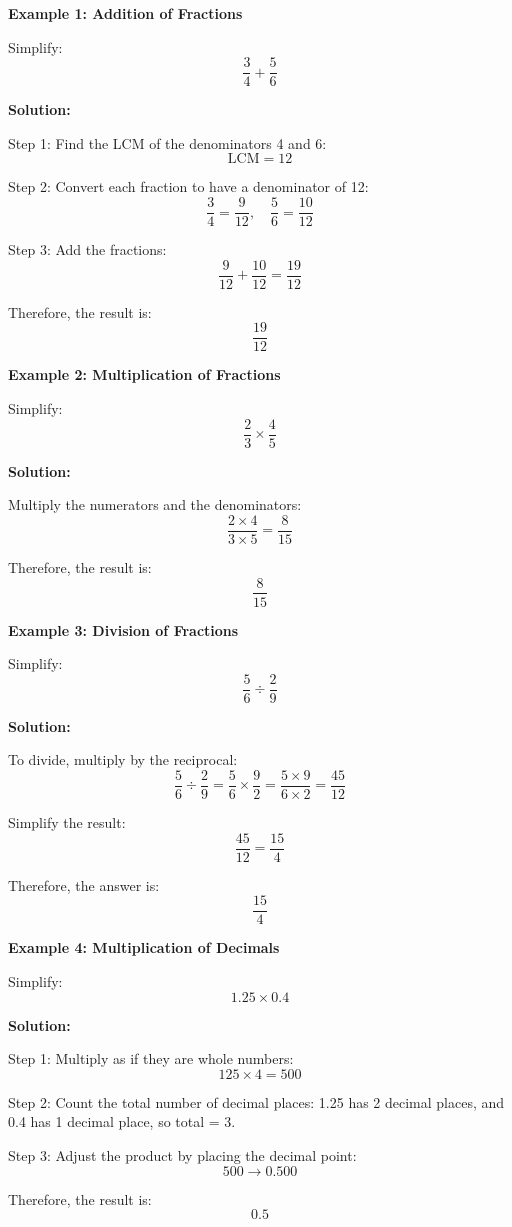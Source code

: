 \begin{flushleft}
\textbf{Example 1: Addition of Fractions}

Simplify:  
\[
\frac{3}{4} + \frac{5}{6}
\]

\textbf{Solution:} \vspace{0.2cm}

Step 1: Find the LCM of the denominators 4 and 6:  
\[
\text{LCM} = 12
\]

Step 2: Convert each fraction to have a denominator of 12:  
\[
\frac{3}{4} = \frac{9}{12}, \quad \frac{5}{6} = \frac{10}{12}
\]

Step 3: Add the fractions:  
\[
\frac{9}{12} + \frac{10}{12} = \frac{19}{12}
\]

Therefore, the result is:  
\[
\frac{19}{12}
\]
\end{flushleft}


\begin{flushleft}
\textbf{Example 2: Multiplication of Fractions}

Simplify:  
\[
\frac{2}{3} \times \frac{4}{5}
\]

\textbf{Solution:}

Multiply the numerators and the denominators:
\[
\frac{2 \times 4}{3 \times 5} = \frac{8}{15}
\]

Therefore, the result is:
\[
\frac{8}{15}
\]
\end{flushleft}

\begin{flushleft}
\textbf{Example 3: Division of Fractions}

Simplify:  
\[
\frac{5}{6} \div \frac{2}{9}
\]

\textbf{Solution:}

To divide, multiply by the reciprocal:
\[
\frac{5}{6} \div \frac{2}{9} = \frac{5}{6} \times \frac{9}{2} = \frac{5 \times 9}{6 \times 2} = \frac{45}{12}
\]

Simplify the result:
\[
\frac{45}{12} = \frac{15}{4}
\]

Therefore, the answer is:
\[
\frac{15}{4}
\]
\end{flushleft}

\begin{flushleft}
\textbf{Example 4: Multiplication of Decimals}

Simplify:  
\[
1.25 \times 0.4
\]

\textbf{Solution:} \vspace{0.2cm}

Step 1: Multiply as if they are whole numbers:  
\[
125 \times 4 = 500
\]

Step 2: Count the total number of decimal places:  
1.25 has 2 decimal places, and 0.4 has 1 decimal place, so total = 3.

Step 3: Adjust the product by placing the decimal point:  
\[
500 \rightarrow 0.500
\]

Therefore, the result is:  
\[
0.5
\]
\end{flushleft}

